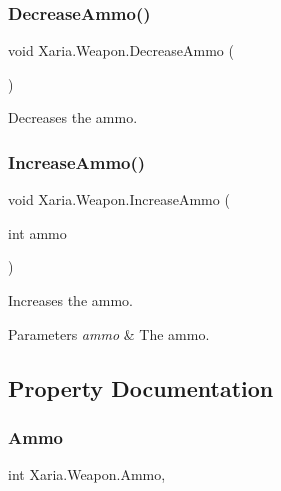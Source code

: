 \subsubsection{\texorpdfstring{Decrease\+Ammo()}{DecreaseAmmo()}}
{\footnotesize\ttfamily void Xaria.\+Weapon.\+Decrease\+Ammo (\begin{DoxyParamCaption}{ }\end{DoxyParamCaption})\hspace{0.3cm}{\ttfamily [inline]}}



Decreases the ammo. 

\mbox{\label{classXaria_1_1Weapon_a7aead7e0fb4bd021adacd502513def5f}} 
\subsubsection{\texorpdfstring{Increase\+Ammo()}{IncreaseAmmo()}}
{\footnotesize\ttfamily void Xaria.\+Weapon.\+Increase\+Ammo (\begin{DoxyParamCaption}\item[{int}]{ammo }\end{DoxyParamCaption})\hspace{0.3cm}{\ttfamily [inline]}}



Increases the ammo. 


\begin{DoxyParams}{Parameters}
{\em ammo} & The ammo.\\
\hline
\end{DoxyParams}


\subsection{Property Documentation}
\mbox{\label{classXaria_1_1Weapon_ac71f37812ae3f4e4cab4b44ee379d302}} 
\subsubsection{\texorpdfstring{Ammo}{Ammo}}
{\footnotesize\ttfamily int Xaria.\+Weapon.\+Ammo\hspace{0.3cm}{\ttfamily [get]}, {}}



